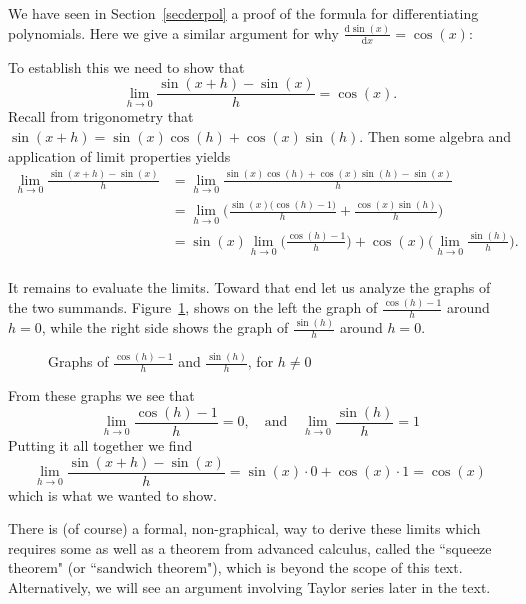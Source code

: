 \begin{bsp}
We have seen in Section~\ref{secderpol} a proof of the formula for
differentiating polynomials. Here we give a similar argument for why
$\displaystyle\frac{\mbox{d}\sin(x)}{\mbox{d}x}=\cos(x)$:

To establish this we need to show that
\[\lim_{h \to 0}\frac{\sin(x+h)-\sin(x)}{h} = \cos(x).\]
Recall from trigonometry that $\sin(x+h) = \sin(x)\cos(h) + \cos(x)\sin(h)$. Then some algebra and application of limit properties yields
\begin{equation*}
\begin{split}
\lim_{h \to 0}\frac{\sin(x+h)-\sin(x)}{h} &= \lim_{h \to 0} \frac{\sin(x)\cos(h) + \cos(x)\sin(h) - \sin(x)}{h} \\
&= \lim_{h \to 0} \bigg(\frac{\sin(x)\big(\cos(h)-1\big)}{h} + \frac{\cos(x)\sin(h)}{h} \bigg) \\
&= \sin(x) \lim_{h \to 0}\bigg(\frac{\cos(h)-1}{h}\bigg) + \cos(x)\bigg(\lim_{h \to 0}\frac{\sin(h)}{h}\bigg).\\
\end{split}
\end{equation*}

It remains to evaluate the limits. Toward that end let us analyze the graphs
of the two summands. Figure~\ref{tnex1figs}, shows on the left the graph of 
$\frac{\cos(h)-1}{h}$ around $h=0$, while the right side shows the graph of 
$\frac{\sin(h)}{h}$ around $h=0$.

\begin{figure}
\begin{center}
\qquad
\end{center}
\caption{Graphs of $\frac{\cos(h)-1}{h}$ and $\frac{\sin(h)}{h}$, for
$h\neq0$}
\label{tnex1figs}
\end{figure}


From these graphs we see that 
\[
\lim_{h \to 0}\frac{\cos(h)-1}{h} = 0, \quad\mbox{and}\quad \lim_{h \to 0}\frac{\sin(h)}{h} = 1
\]
Putting it all together we find
\[\lim_{h \to 0}\frac{\sin(x+h)-\sin(x)}{h} = \sin(x) \cdot 0 + \cos(x) \cdot 1 = \cos(x)\]
which is what we wanted to show. 

There is (of course) a formal, non-graphical, way to derive these limits which
requires some as well as a theorem from advanced calculus, called the
``squeeze theorem" (or ``sandwich theorem"), which is beyond the scope of
this text. Alternatively, we will see an argument involving Taylor series
later in the text.
\end{bsp}

